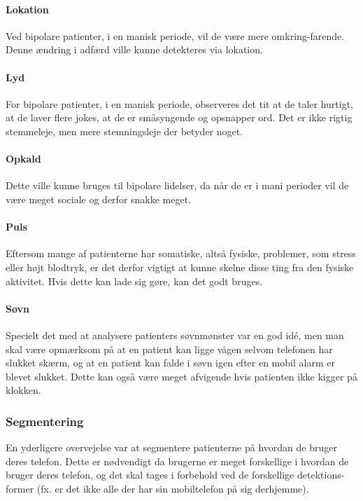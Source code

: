 \paragraph{Lokation}
Ved bipolare patienter, i en manisk periode, vil de være mere omkring-farende.
Denne ændring i adfærd ville kunne detekteres via lokation.

\paragraph{Lyd}
For bipolare patienter, i en manisk periode, observeres det tit at de taler hurtigt, at de laver flere jokes, at de er småsyngende og opsnapper ord. Det er ikke rigtig stemmeleje, men mere stemningsleje der betyder noget.

\paragraph{Opkald}
Dette ville kunne bruges til bipolare lidelser, da når de er i mani perioder vil de være meget sociale og derfor snakke meget. 

\paragraph{Puls}
Eftersom mange af patienterne har somatiske, altså fysiske, problemer, som stress eller højt blodtryk, er det derfor vigtigt at kunne skelne disse ting fra den fysiske aktivitet.
Hvis dette kan lade sig gøre, kan det godt bruges.

\paragraph{Søvn}
Specielt det med at analysere patienters søvnmønster var en god idé, men man skal være opmærksom på at en patient kan ligge vågen selvom telefonen har slukket skærm, og at en patient kan falde i søvn igen efter en mobil alarm er blevet slukket.
Dette kan også være meget afvigende hvis patienten ikke kigger på klokken.

\subsubsection{Segmentering}
En yderligere overvejelse var at segmentere patienterne på hvordan de bruger deres telefon.
Dette er nødvendigt da brugerne er meget forskellige i hvordan de bruger deres telefon, og det skal tages i forbehold ved de forskellige detektions-former (fx. er det ikke alle der har sin mobiltelefon på sig derhjemme).

